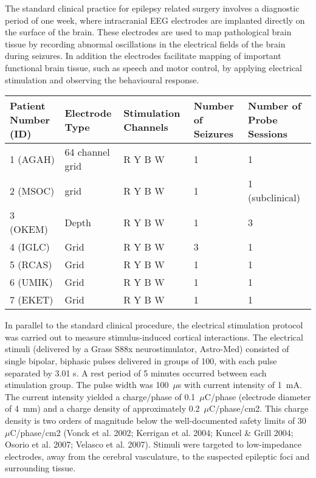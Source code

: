 \documentclass[]{article}
\begin{document}
The standard clinical practice for epilepsy related surgery involves a diagnostic period of one week, where intracranial EEG electrodes are implanted directly on the surface of the brain. These electrodes are used to map pathological brain tissue by recording abnormal oscillations in the electrical fields of the brain during seizures. In addition the electrodes facilitate mapping of important functional brain tissue, such as speech and motor control, by applying electrical stimulation and observing the behavioural response.  

\begin{tabular}{|p{2.4cm}|p{2.4cm}|p{2.4cm}|p{2.4cm}|p{3cm}|} \hline
\textbf{Patient Number (ID)} & \textbf{Electrode Type} & \textbf{Stimulation Channels} & \textbf{Number of Seizures} & \textbf{Number of Probe Sessions}\\ \hline
1 (AGAH) & 64 channel grid & R Y B W & 1 & 1 \\ \hline
2 (MSOC) & grid & R Y B W & 1 & 1 (subclinical) \\ \hline
3 (OKEM) & Depth & R Y B W & 1 & 3 \\ \hline
4 (IGLC) & Grid & R Y B W & 3 & 1 \\ \hline
5 (RCAS) & Grid & R Y B W & 1 & 1 \\ \hline
6 (UMIK) & Grid & R Y B W & 1 & 1 \\ \hline
7 (EKET) & Grid & R Y B W & 1 & 1 \\ \hline
\end{tabular}

In parallel to the standard clinical procedure, the electrical stimulation protocol was carried out to measure stimulus-induced cortical interactions. The electrical stimuli (delivered by a Grass S88x neurostimulator, Astro-Med) consisted of single bipolar, biphasic pulses delivered in groups of 100, with each pulse separated by 3.01 s. A rest period of 5 minutes occurred between each stimulation group. The pulse width was 100~$\mu$s with current intensity of 1~mA. The current intensity yielded a charge/phase of 0.1~$\mu$C/phase (electrode diameter of 4~mm) and a charge density of approximately 0.2~$\mu$C/phase/cm2. This charge density is two orders of magnitude below the well-documented safety limits of 30~$\mu$C/phase/cm2 (Vonck et al. 2002; Kerrigan et al. 2004; Kuncel \& Grill 2004; Osorio et al. 2007; Velasco et al. 2007). Stimuli were targeted to low-impedance electrodes, away from the cerebral vasculature, to the suspected epileptic foci and surrounding tissue.
\end{document}
